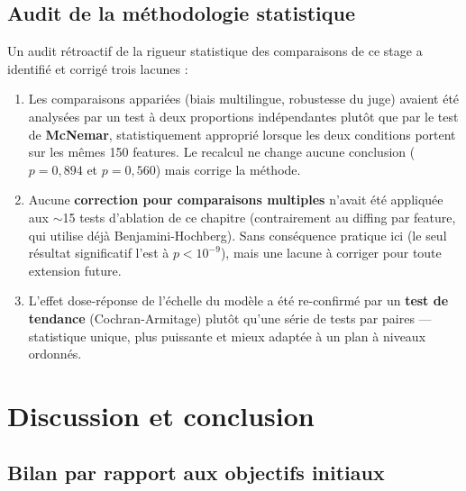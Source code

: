 \documentclass[11pt]{article}
\begin{document}
\subsection{Audit de la méthodologie statistique}
\label{subsec:audit-stats}

Un audit rétroactif de la rigueur statistique des comparaisons de ce stage a
identifié et corrigé trois lacunes :

\begin{enumerate}
  \item Les comparaisons appariées (biais multilingue, robustesse du juge)
    avaient été analysées par un test à deux proportions indépendantes plutôt
    que par le test de \textbf{McNemar}, statistiquement approprié lorsque
    les deux conditions portent sur les mêmes 150 features. Le recalcul ne
    change aucune conclusion ($p=0{,}894$ et $p=0{,}560$) mais corrige la
    méthode.
  \item Aucune \textbf{correction pour comparaisons multiples} n'avait été
    appliquée aux $\sim$15 tests d'ablation de ce chapitre (contrairement au
    diffing par feature, qui utilise déjà Benjamini-Hochberg). Sans
    conséquence pratique ici (le seul résultat significatif l'est à
    $p<10^{-9}$), mais une lacune à corriger pour toute extension future.
  \item L'effet dose-réponse de l'échelle du modèle a été re-confirmé par un
    \textbf{test de tendance} (Cochran-Armitage) plutôt qu'une série de tests
    par paires --- statistique unique, plus puissante et mieux adaptée à un
    plan à niveaux ordonnés.
\end{enumerate}

\newpage
\section{Discussion et conclusion}
\label{sec:discussion}

\subsection{Bilan par rapport aux objectifs initiaux}
\end{document}
